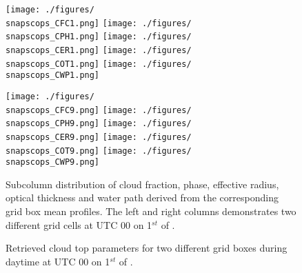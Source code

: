 \begin{figure}[!ht]
  \centering
  \begin{minipage}[c]{0.4\textwidth}
    \texttt{[image: ./figures/\\snapscops\_CFC1.png]}
    \texttt{[image: ./figures/\\snapscops\_CPH1.png]}
    \texttt{[image: ./figures/\\snapscops\_CER1.png]}
    \texttt{[image: ./figures/\\snapscops\_COT1.png]}
    \texttt{[image: ./figures/\\snapscops\_CWP1.png]}
  \end{minipage}\hspace*{1cm}
  \begin{minipage}[c]{0.4\textwidth}
    \texttt{[image: ./figures/\\snapscops\_CFC9.png]}
    \texttt{[image: ./figures/\\snapscops\_CPH9.png]}
    \texttt{[image: ./figures/\\snapscops\_CER9.png]}
    \texttt{[image: ./figures/\\snapscops\_COT9.png]}
    \texttt{[image: ./figures/\\snapscops\_CWP9.png]}
  \end{minipage}
  \caption[Down-scaled cloud parameter profiles.]{Subcolumn distribution 
of cloud fraction, phase, effective radius, optical thickness and 
water path derived from the corresponding grid box mean profiles. 
The left and right columns demonstrates two different grid cells 
at UTC 00 on 1$^{st}$ of \MonthYear.}
  \label{fig:scops}
\end{figure}





\begin{figure}[!htp]
  \begin{minipage}{\textwidth}
  \end{minipage}\vspace*{1cm}
  \begin{minipage}{\textwidth}
  \end{minipage}
  \caption[Retrieved cloud top parameters based on subcolumn distribution.]
{Retrieved cloud top parameters for two different grid boxes during daytime
at UTC 00 on 1$^{st}$ of \MonthYear.}
\label{fig:retrieved}
\end{figure}




